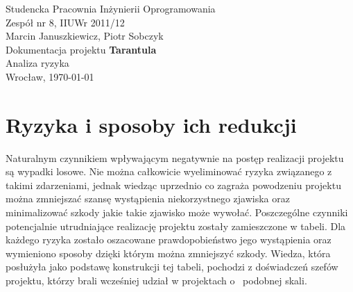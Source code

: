 \documentclass[11pt,leqno]{article}
\begin{document}
\begin{center}
\thispagestyle{empty}
{\Large Studencka Pracownia Inżynierii Oprogramowania}\\[0.5cm]
{\Large Zespół nr 8, IIUWr 2011/12}\\[2.5cm]

{\large Marcin Januszkiewicz, Piotr Sobczyk}\\[0.5cm]
{\huge Dokumentacja projektu \textbf{Tarantula}}\\[0.25cm]
{\huge Analiza ryzyka}\\[0.5cm]
\vfill
{\large Wrocław, \today}
\end{center}

\newpage
\tableofcontents
\newpage

\section{Ryzyka i sposoby ich redukcji}
\noindent
Naturalnym czynnikiem wpływającym negatywnie na postęp realizacji projektu są wypadki losowe. Nie można całkowicie wyeliminować ryzyka związanego
z takimi zdarzeniami, jednak wiedząc uprzednio co zagraża powodzeniu projektu można zmniejszać szansę wystąpienia niekorzystnego zjawiska oraz minimalizować szkody
jakie takie zjawisko może wywołać. Poszczególne czynniki potencjalnie utrudniające realizację projektu zostały zamieszczone w tabeli. 
Dla każdego ryzyka zostało oszacowane prawdopobieństwo jego wystąpienia oraz wymieniono sposoby dzięki którym można zmniejszyć szkody. 
Wiedza, która posłużyła jako podstawę konstrukcji tej tabeli, pochodzi z doświadczeń szefów projektu, którzy brali wcześniej udział w projektach o~ podobnej skali.
\end{document}
